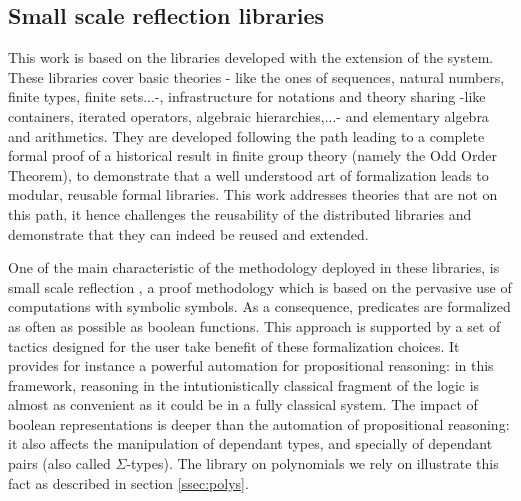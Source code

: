 \documentclass{mscs}
\begin{document}

\subsection{Small scale reflection libraries}
This work is based on the \ssr{} libraries \cite{ssrsite}
developed with the \ssr{} extension
\cite{GONTHIER:2008:INRIA-00258384:4} of the \Coq{} system.
These libraries cover basic theories - like the ones of sequences, natural
numbers, finite types, finite sets...-, infrastructure for notations and
theory sharing -like containers, iterated operators, algebraic
hierarchies,...- and elementary algebra and arithmetics. 
They are developed following the path leading to a complete formal
proof of a historical result in finite group theory (namely the Odd Order
Theorem), to demonstrate that a well
understood art of formalization leads to modular, reusable formal
libraries. This work addresses theories that
are not on this path, it hence challenges the reusability of the
distributed libraries and demonstrate that they can indeed be reused
and extended.

One of the main characteristic of the methodology deployed in these
libraries, is small scale reflection 
\cite{ssr-tutorial}, a proof methodology which is based on the
pervasive use of computations with symbolic symbols. 
As a consequence, predicates are formalized as often as possible as
boolean functions. This approach is supported by a set of tactics
designed for the user take benefit of these formalization
choices. It provides for instance a powerful automation for propositional
reasoning: in this framework, reasoning in the intutionistically
classical fragment of the \Coq{} logic is almost as convenient as it
could be in a fully classical system.
The impact of boolean representations is deeper than the automation of
propositional reasoning: it also affects the manipulation of dependant
types, and specially of dependant pairs (also called
$\Sigma$-types). The \ssr{} library on polynomials we rely on
illustrate this fact as described in section \ref{ssec:polys}.
\end{document}
